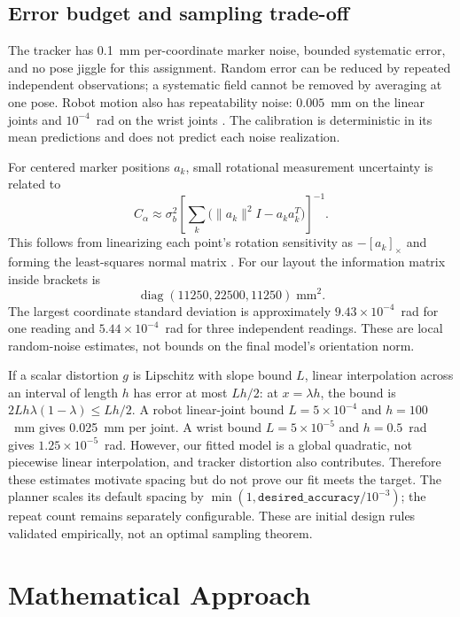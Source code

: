 \documentclass[11pt]{article}
\begin{document}
\subsection{Error budget and sampling trade-off}
The tracker has 0.1~mm per-coordinate marker noise, bounded systematic error, and no pose jiggle for this assignment. Random error can be reduced by repeated independent observations; a systematic field cannot be removed by averaging at one pose. Robot motion also has repeatability noise: $0.005$~mm on the linear joints and $10^{-4}$~rad on the wrist joints \cite{handout}. The calibration is deterministic in its mean predictions and does not predict each noise realization.

For centered marker positions $a_k$, small rotational measurement uncertainty is related to
\begin{equation}
 C_\alpha\approx\sigma_b^2\left[\sum_k\bigl(\|a_k\|^2I-a_ka_k^T\bigr)\right]^{-1}.
 \label{eq:markerinfo}
\end{equation}
This follows from linearizing each point's rotation sensitivity as $-[a_k]_\times$ and forming the least-squares normal matrix \cite{calibration}. For our layout the information matrix inside brackets is
\[\operatorname{diag}(11250,22500,11250)\;\mathrm{mm}^2.\] The largest coordinate standard deviation is approximately $9.43\times10^{-4}$~rad for one reading and $5.44\times10^{-4}$~rad for three independent readings. These are local random-noise estimates, not bounds on the final model's orientation norm.

If a scalar distortion $g$ is Lipschitz with slope bound $L$, linear interpolation across an interval of length $h$ has error at most $Lh/2$: at $x=\lambda h$, the bound is $2Lh\lambda(1-\lambda)\le Lh/2$. A robot linear-joint bound $L=5\times10^{-4}$ and $h=100$~mm gives 0.025~mm per joint. A wrist bound $L=5\times10^{-5}$ and $h=0.5$~rad gives $1.25\times10^{-5}$~rad. However, our fitted model is a global quadratic, not piecewise linear interpolation, and tracker distortion also contributes. Therefore these estimates motivate spacing but do not prove our fit meets the target. The planner scales its default spacing by $\min(1,\texttt{desired\_accuracy}/10^{-3})$; the repeat count remains separately configurable. These are initial design rules validated empirically, not an optimal sampling theorem.

\section{Mathematical Approach}
\end{document}
